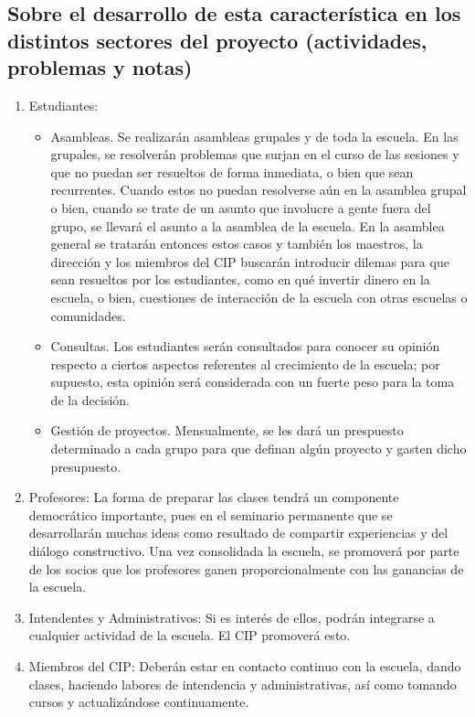 \documentclass[10pt,letterpaper]{book}
\begin{document}
		\subsection{Sobre el desarrollo de esta característica en los distintos sectores del proyecto (actividades, problemas y notas)}
			\begin{enumerate}[label=\Alph*]
			\item Estudiantes: 
		\begin{itemize}
		\item Asambleas. Se realizarán asambleas grupales y de toda la escuela. En las grupales, se resolverán problemas que surjan en el curso de las sesiones y que no puedan ser resueltos de forma inmediata, o bien que sean recurrentes. Cuando estos no puedan resolverse aún en la asamblea grupal o bien, cuando se trate de un asunto que involucre a gente fuera del grupo, se llevará el asunto a la asamblea de la escuela. En la asamblea general se tratarán entonces estos casos y también los maestros, la dirección y los miembros del CIP buscarán introducir dilemas para que sean resueltos por los estudiantes, como en qué invertir dinero en la escuela, o bien, cuestiones de interacción de la escuela con otras escuelas o comunidades.
		\item Consultas. Los estudiantes serán consultados para conocer su opinión respecto a ciertos aspectos referentes al crecimiento de la escuela; por supuesto, esta opinión será considerada con un fuerte peso para la toma de la decisión.
		\item Gestión de proyectos. Mensualmente, se les dará un prespuesto determinado a cada grupo para que definan algún proyecto y gasten dicho presupuesto.
\end{itemize}					

			\item Profesores: La forma de preparar las clases tendrá un componente democrático importante, pues en el seminario permanente que se desarrollarán muchas ideas como resultado de compartir experiencias y del diálogo constructivo. Una vez consolidada la escuela, se promoverá por parte de los socios que los profesores ganen proporcionalmente con las ganancias de la escuela.
			\item Intendentes y Administrativos: Si es interés de ellos, podrán integrarse a cualquier actividad de la escuela. El CIP promoverá esto.
			\item Miembros del CIP: Deberán estar en contacto continuo con la escuela, dando clases, haciendo labores de intendencia y administrativas, así como tomando cursos y actualizándose continuamente.
			\end{enumerate}
\end{document}
